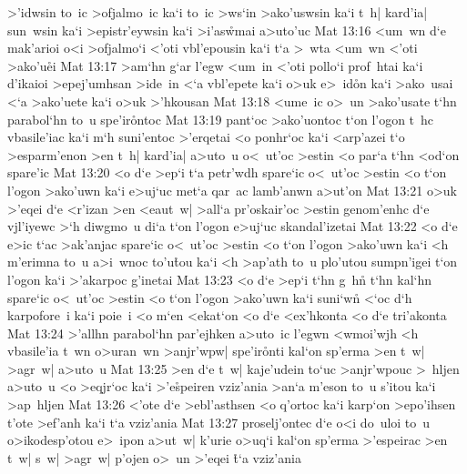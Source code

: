 >'idwsin
to~ic
>ofjalmo~ic
ka`i
to~ic
>ws`in
>ako'uswsin
ka`i
t~h|
kard'ia|
sun~wsin
ka`i
>epistr'eywsin
ka`i
>i'as\r{w}mai
a>uto'uc\bibvsend
\vs Mat 13:16
<um~wn
d`e
mak'arioi
o<i
>ofjalmo`i
<'oti
vbl'epousin
ka`i
t`a
>~wta
<um~wn
<'oti
>ako'u\r{e}i\bibvsend
{}
\vs Mat 13:17
>am`hn
g`ar
l'egw
<um~in
<'oti
pollo`i
prof~htai
ka`i
d'ikaioi
>epej'umhsan
>ide~in
<`a
vbl'epete
ka`i
o>uk
e>~id\r{o}n
ka`i
>ako~usai
<`a
>ako'uete
ka`i
o>uk
>'hkousan\bibvsend
\vs Mat 13:18
<ume~ic
o>~un
>ako'usate
t`hn
parabol`hn
to~u
spe'ir\r{o}ntoc\bibvsend
{}
\vs Mat 13:19
pant`oc
>ako'uontoc
t`on
l'ogon
t~hc
vbasile'iac
ka`i
m`h
suni'entoc
>'erqetai
<o
ponhr`oc
ka`i
<arp'azei
t`o
>esparm'enon
>en
t~h|
kard'ia|
a>uto~u
o<~ut'oc
>estin
<o
par`a
t`hn
<od`on
spare'ic\bibvsend
\vs Mat 13:20
<o
d`e
>ep`i
t`a
petr'wdh
spare`ic
o<~ut'oc
>estin
<o
t`on
l'ogon
>ako'uwn
ka`i
e>uj`uc
met`a
qar~ac
lamb'anwn
a>ut'on\bibvsend
\vs Mat 13:21
o>uk
>'eqei
d`e
<r'izan
>en
<eaut~w|
>all`a
pr'oskair'oc
>estin
genom'enhc
d`e
vjl'iyewc
>`h
diwgmo~u
di`a
t`on
l'ogon
e>uj`uc
skandal'izetai\bibvsend
\vs Mat 13:22
<o
d`e
e>ic
t`ac
>ak'anjac
spare`ic
o<~ut'oc
>estin
<o
t`on
l'ogon
>ako'uwn
ka`i
<h
m'erimna
to~u
a>i~wnoc
to'u\r{t}ou
ka`i
<h
>ap'ath
to~u
plo'utou
sumpn'igei
t`on
l'ogon
ka`i
>'akarpoc
g'inetai\bibvsend
\vs Mat 13:23
<o
d`e
>ep`i
t`hn
g~hn\r{}
t`hn
kal`hn
spare`ic
o<~ut'oc
>estin
<o
t`on
l'ogon
>ako'uwn
ka`i
suni`w\r{n}
<`oc
d`h
karpofore~i
ka`i
poie~i
<o
m`en
<ekat`on
<o
d`e
<ex'hkonta
<o
d`e
tri'akonta\bibvsend
\vs Mat 13:24
>'allhn
parabol`hn
par'ejhken
a>uto~ic
l'egwn
<wmoi'wjh
<h
vbasile'ia
t~wn
o>uran~wn
>anjr'wpw|
spe'ir\r{o}nti
kal`on
sp'erma
>en
t~w|
>agr~w|
a>uto~u\bibvsend
\vs Mat 13:25
>en
d`e
t~w|
kaje'udein
to`uc
>anjr'wpouc
>~hljen
a>uto~u
<o
>eqjr`oc
ka`i
>'e\r{s}peiren
vziz'ania
>an`a
m'eson
to~u
s'itou
ka`i
>ap~hljen\bibvsend
\vs Mat 13:26
<'ote
d`e
>ebl'asthsen
<o
q'ortoc
ka`i
karp`on
>epo'ihsen
t'ote
>ef'anh
ka`i
t`a
vziz'ania\bibvsend
\vs Mat 13:27
proselj'ontec
d`e
o<i
do~uloi
to~u
o>ikodesp'otou
e>~ipon
a>ut~w|
k'urie
o>uq`i
kal`on
sp'erma
>'espeirac
>en
t~w|
s~w|
>agr~w|
p'ojen
o>~un
>'eqei
\r{t}`a
vziz'ania\bibvsend
